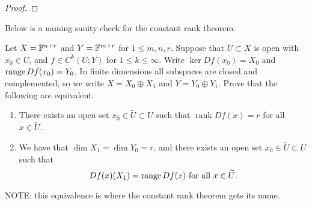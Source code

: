 \documentclass[a4paper]{article}
\begin{document}
\begin{proof}
{}
\end{proof}

Below is a naming sanity check for the constant rank theorem.

\begin{thm}
Let $X = \mathbb{F}^{n+r}$ and $Y = \mathbb{F}^{m+r}$ for $1\le m,n,r$.  
Suppose that $U \subset X$ is open with $x_0 \in U$, 
and $f \in C^k(U;Y)$ for $1 \le k \le \infty$.   
Write  $\ker Df(x_0) = X_0$ and $\operatorname{range} Df(x_0) = Y_0$.  
In finite dimensions all subspaces are closed and 
complemented, so we write $X = X_0 \oplus X_1$ and 
$Y = Y_0 \oplus Y_1$.  Prove that the following are 
equivalent.
\begin{enumerate}
 \item There exists an open set $x_0 \in \tilde{U} 
 \subset U$ such that $\operatorname{rank} Df(x) = r$ 
 for all $x \in \tilde{U}$.
 \item We have that $\dim X_1 = \dim Y_0 = r$, 
 and there exists an open set $x_0 \in \tilde{U} 
 \subset U$ such that 
\[
 Df(x)(X_1) = \operatorname{range} Df(x) \text{ for all }x \in \widetilde{U}.
\]
\end{enumerate}
NOTE: this equivalence is where the constant rank 
theorem gets its name.
\end{thm}
\end{document}
